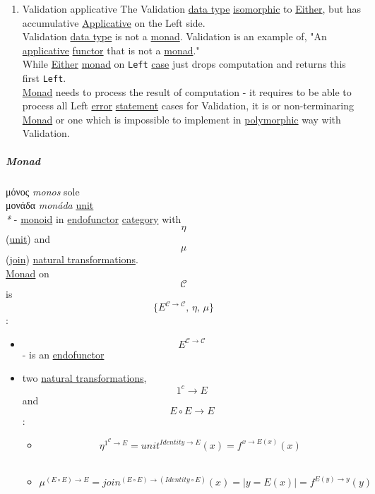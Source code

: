 \documentclass[11pt]{article}
\begin{document}
\begin{enumerate}
\item \label{org3b8b5bc}Validation applicative
\label{sec:orgf29b306}
The Validation \hyperref[org212d9c3]{data type} \hyperref[org5910739]{isomorphic} to \hyperref[org6f16842]{Either}, but has accumulative \hyperref[org2dfdf4a]{Applicative} on the Left side.\\
Validation \hyperref[org212d9c3]{data type} is not a \hyperref[org86a5d95]{monad}. Validation is an example of, "An \hyperref[org2dfdf4a]{applicative} \hyperref[orgf2f6841]{functor} that is not a \hyperref[org86a5d95]{monad}."\\
While \hyperref[org6f16842]{Either} \hyperref[org86a5d95]{monad} on \texttt{Left} \hyperref[org41d12b6]{case} just drops computation and returns this first \texttt{Left}.\\
\hyperref[org86a5d95]{Monad} needs to process the result of computation - it requires to be able to process all Left \hyperref[org2b27c5e]{error} \hyperref[org36313c0]{statement} cases for Validation, it is or non-terminaring \hyperref[org86a5d95]{Monad} or one which is impossible to implement in \hyperref[orgac4d581]{polymorphic} way with Validation.\\
\end{enumerate}

\subparagraph{\label{org86a5d95}Monad}
\label{sec:org6d600c2}
μόνος \emph{monos} sole\\
μονάδα \emph{monáda} \hyperref[org0b3ee46]{unit}\\

\emph{*} - \hyperref[org37d140b]{monoid} in \hyperref[orga4a1776]{endofunctor} \hyperref[org0450535]{category} with $$ \eta $$ (\hyperref[org0b3ee46]{unit}) and $$ \mu $$ (\hyperref[org949a0df]{join}) \hyperref[org5148d4c]{natural transformations}.\\

\hyperref[org86a5d95]{Monad} on $$ \mathcal{C} $$ is $$ \{E^{\mathcal{C \to C}}, \, \eta, \, \mu\} $$:\\
\begin{itemize}
\item $$ E^{\mathcal{C \to C}} $$ - is an \hyperref[orga4a1776]{endofunctor}\\
\item two \hyperref[org5148d4c]{natural transformations}, $$ 1^c \to E $$ and $$ E \circ E \to E $$:\\
\begin{itemize}
\item $$ \eta^{1^{\mathcal{C}} \to E} = {unit}^{Identity \to E}(x) = f^{ x \to E(x)}(x) $$\\
\item $$ \mu^{(E \circ E) \to E} = {join}^{(E \circ E) \to (Identity \circ E)}(x) = | y = E(x) | = f^{E (y) \to y}(y) $$\\
\end{itemize}
\end{itemize}
\end{document}
